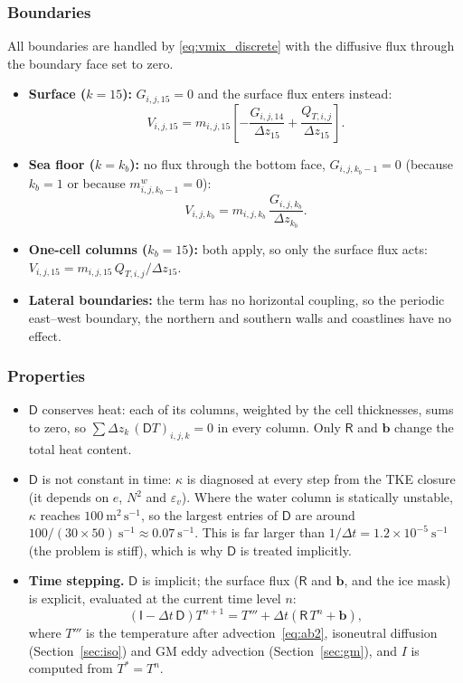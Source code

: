 \documentclass{article}
\begin{document}
\subsubsection*{Boundaries}
All boundaries are handled by \eqref{eq:vmix_discrete} with the diffusive flux through the boundary face set to zero.
\begin{itemize}
\item \textbf{Surface ($k = 15$):} $G_{i,j,15} = 0$ and the surface flux enters instead:
\[
V_{i,j,15} = m_{i,j,15}\left[ -\frac{G_{i,j,14}}{\Delta z_{15}} + \frac{Q_{T,i,j}}{\Delta z_{15}} \right].
\]
\item \textbf{Sea floor ($k = k_b$):} no flux through the bottom face, $G_{i,j,k_b-1} = 0$ (because $k_b = 1$ or because $m^w_{i,j,k_b-1} = 0$):
\[
V_{i,j,k_b} = m_{i,j,k_b}\, \frac{G_{i,j,k_b}}{\Delta z_{k_b}}.
\]
\item \textbf{One-cell columns ($k_b = 15$):} both apply, so only the surface flux acts: $V_{i,j,15} = m_{i,j,15}\, Q_{T,i,j} / \Delta z_{15}$.
\item \textbf{Lateral boundaries:} the term has no horizontal coupling, so the periodic east--west boundary, the northern and southern walls and coastlines have no effect.
\end{itemize}

\subsubsection*{Properties}
\begin{itemize}
\item $\mathsf{D}$ conserves heat: each of its columns, weighted by the cell thicknesses, sums to zero, so $\sum \Delta z_k\, (\mathsf{D}T)_{i,j,k} = 0$ in every column.
Only $\mathsf{R}$ and $\mathbf{b}$ change the total heat content.
\item $\mathsf{D}$ is not constant in time: $\kappa$ is diagnosed at every step from the TKE closure (it depends on $e$, $N^2$ and $\varepsilon_v$).
Where the water column is statically unstable, $\kappa$ reaches $100~\text{m}^2\,\text{s}^{-1}$, so the largest entries of $\mathsf{D}$ are around $100/(30 \times 50)~\text{s}^{-1} \approx 0.07~\text{s}^{-1}$.
This is far larger than $1/\Delta t = 1.2\times10^{-5}~\text{s}^{-1}$ (the problem is stiff), which is why $\mathsf{D}$ is treated implicitly.
\item \textbf{Time stepping.} $\mathsf{D}$ is implicit; the surface flux ($\mathsf{R}$ and $\mathbf{b}$, and the ice mask) is explicit, evaluated at the current time level $n$:
\[
\left( \mathsf{I} - \Delta t\, \mathsf{D} \right) T^{n+1} = T''' + \Delta t \left( \mathsf{R}\, T^n + \mathbf{b} \right),
\]
where $T'''$ is the temperature after advection~\eqref{eq:ab2}, isoneutral diffusion (Section~\ref{sec:iso}) and GM eddy advection (Section~\ref{sec:gm}), and $I$ is computed from $T^\ast = T^n$.
\end{itemize}
\end{document}
